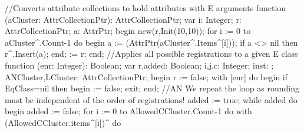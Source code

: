 \nwenddocs{}\endmoddef\nwstartdeflinemarkup\nwenddeflinemarkup
//Converts attribute collections to hold attributes with E arguments
function (aCluster: AttrCollectionPtr): AttrCollectionPtr;
var
   i: Integer;
   r: AttrCollectionPtr;
   a: AttrPtr;
begin
   new(r,Init(10,10));
   for i := 0 to aCluster^.Count-1 do
   begin
      a := (AttrPtr(aCluster^.Items^[i]));
      if a <> nil then r^.Insert(a);
   end;
    := r;
end;
\eatline
{}\nwendcode{}\nwdocspar
\nwenddocs{}\endmoddef\nwstartdeflinemarkup\nwenddeflinemarkup
//Applies all possible registrations to a given E class
function (enr: Integer): Boolean;
var
   r,added: Boolean;
   i,j,c: Integer;
   inst: ;
   ANCluster,LCluster: AttrCollectionPtr;
begin
   r := false;
   with [enr] do
   begin
      if EqClass=nil then
      begin
          := false;
         exit;
      end;
      //AN We repeat the loop as rounding must be independent of the order of registrations!
      added := true;
      while added do
      begin
         added := false;
         for i := 0 to AllowedCCluster.Count-1 do
            with (AllowedCCluster.items^[i])^ do

